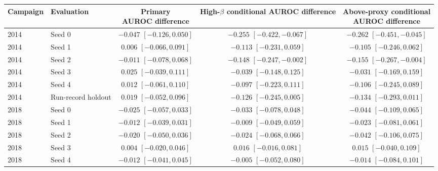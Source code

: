 \begin{table}[t]
\centering
\small
\setlength{\tabcolsep}{4pt}
\begin{tabular}{@{}llccc@{}}
\toprule
Campaign & Evaluation & \shortstack{Primary\\AUROC difference} & \shortstack{High-$\beta$ conditional\\AUROC difference} & \shortstack{Above-proxy conditional\\AUROC difference} \\
\midrule
2014 & Seed 0 & $-0.047$ {\scriptsize $[-0.126, 0.050]$} & $-0.255$ {\scriptsize $[-0.422, -0.067]$} & $-0.262$ {\scriptsize $[-0.451, -0.045]$} \\
2014 & Seed 1 & $0.006$ {\scriptsize $[-0.066, 0.091]$} & $-0.113$ {\scriptsize $[-0.231, 0.059]$} & $-0.105$ {\scriptsize $[-0.246, 0.062]$} \\
2014 & Seed 2 & $-0.011$ {\scriptsize $[-0.078, 0.068]$} & $-0.148$ {\scriptsize $[-0.247, -0.002]$} & $-0.155$ {\scriptsize $[-0.267, -0.004]$} \\
2014 & Seed 3 & $0.025$ {\scriptsize $[-0.039, 0.111]$} & $-0.039$ {\scriptsize $[-0.148, 0.125]$} & $-0.031$ {\scriptsize $[-0.169, 0.159]$} \\
2014 & Seed 4 & $0.012$ {\scriptsize $[-0.061, 0.110]$} & $-0.097$ {\scriptsize $[-0.223, 0.111]$} & $-0.106$ {\scriptsize $[-0.245, 0.089]$} \\
2014 & Run-record holdout & $0.019$ {\scriptsize $[-0.052, 0.096]$} & $-0.126$ {\scriptsize $[-0.245, 0.005]$} & $-0.134$ {\scriptsize $[-0.293, 0.011]$} \\
2018 & Seed 0 & $-0.025$ {\scriptsize $[-0.057, 0.033]$} & $-0.033$ {\scriptsize $[-0.078, 0.048]$} & $-0.044$ {\scriptsize $[-0.109, 0.065]$} \\
2018 & Seed 1 & $-0.012$ {\scriptsize $[-0.039, 0.031]$} & $-0.009$ {\scriptsize $[-0.049, 0.059]$} & $-0.023$ {\scriptsize $[-0.081, 0.061]$} \\
2018 & Seed 2 & $-0.020$ {\scriptsize $[-0.050, 0.036]$} & $-0.024$ {\scriptsize $[-0.068, 0.066]$} & $-0.042$ {\scriptsize $[-0.106, 0.075]$} \\
2018 & Seed 3 & $0.004$ {\scriptsize $[-0.020, 0.046]$} & $0.016$ {\scriptsize $[-0.016, 0.081]$} & $0.015$ {\scriptsize $[-0.040, 0.109]$} \\
2018 & Seed 4 & $-0.012$ {\scriptsize $[-0.041, 0.045]$} & $-0.005$ {\scriptsize $[-0.052, 0.080]$} & $-0.014$ {\scriptsize $[-0.084, 0.101]$} \\

\end{tabular}
\end{table}
